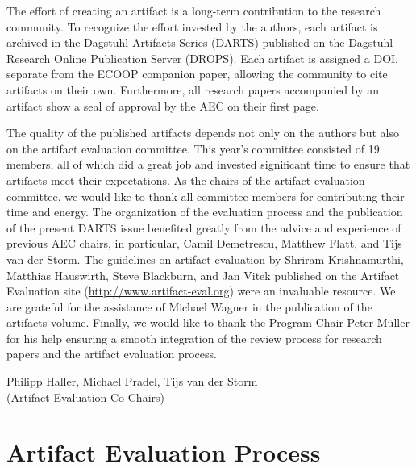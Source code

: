 \documentclass[a4paper,UKenglish]{dartsmaster}
\begin{document}
The effort of creating an artifact is a long-term contribution to the
research community. To recognize the effort invested by the authors, each
artifact is archived in the Dagstuhl Artifacts Series (DARTS) published on
the Dagstuhl Research Online Publication Server (DROPS). Each artifact is
assigned a DOI, separate from the ECOOP companion paper, allowing the
community to cite artifacts on their own. Furthermore, all research papers
accompanied by an artifact show a seal of approval by the AEC on their first
page.

The quality of the published artifacts depends not only on the authors but
also on the artifact evaluation committee. This year's committee consisted
of 19 members, all of which did a great job and invested significant time to
ensure that artifacts meet their expectations. As the chairs of the artifact
evaluation committee, we would like to thank all committee members for
contributing their time and energy. The organization of the evaluation
process and the publication of the present DARTS issue benefited
greatly from the advice and experience of previous AEC chairs, in
particular, Camil Demetrescu, Matthew Flatt, and Tijs van der Storm. The
guidelines on artifact evaluation by Shriram Krishnamurthi, Matthias
Hauswirth, Steve Blackburn, and Jan Vitek published on the Artifact
Evaluation site (\url{http://www.artifact-eval.org}) were an invaluable resource.
We are grateful for the assistance of Michael Wagner in the publication of
the artifacts volume. Finally, we would like to thank the Program Chair
Peter M{\"u}ller for his help ensuring a smooth integration of the review
process for research papers and the artifact evaluation process.

\vspace{1em}
\noindent
Philipp Haller, Michael Pradel, Tijs van der Storm\\
(Artifact Evaluation Co-Chairs)


\chapter{Artifact Evaluation Process}
\end{document}
